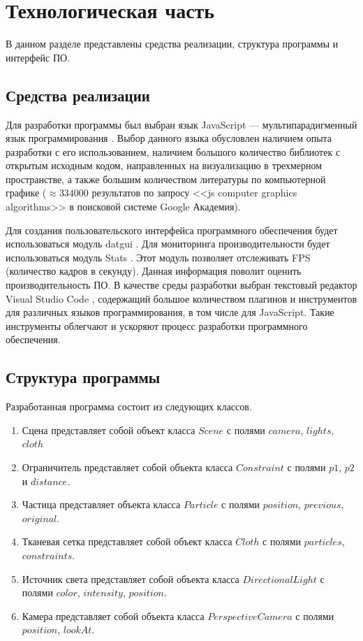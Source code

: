 \chapter{Технологическая часть}

В данном разделе представлены средства реализации, структура программы и интерфейс ПО.

\section{Средства реализации}
Для разработки программы был выбран язык JavaScript --- мультипарадигменный язык программирования \cite{js}. Выбор данного языка обусловлен наличием опыта разработки с его использованием, наличием большого количество библиотек с открытым исходным кодом, направленных на визуализацию в трехмерном пространстве, а также большим количеством литературы по компьютерной графике ($\approx334000$ результатов по запросу <<js computer graphics algorithms>> в поисковой системе Google Академия).

Для создания пользовательского интерфейса программного обеспечения будет использоваться модуль datgui \cite{datgui}. Для мониторинга производительности будет использоваться модуль Stats \cite{stats}. Этот модуль позволяет отслеживать FPS (количество кадров в секунду). Данная информация поволит оценить производительность ПО. В качестве среды разработки выбран текстовый редактор Visual Studio Code \cite{vscode}, содержащий большое количеством плагинов и инструментов для различных языков программирования, в том числе для JavaScript. Такие инструменты облегчают и ускоряют процесс разработки программного обеспечения.

\section{Структура программы}
Разработанная программа состоит из следующих классов.
\begin{enumerate}[label=\arabic*)]
	\item  Сцена представляет собой объект класса $Scene$ с полями $camera$, $lights$, $cloth$
	\item  Ограничитель представляет собой объекта класса $Constraint$ с полями $p1$, $p2$ и $distance$.
	\item  Частица представляет объекта класса $Particle$ с полями $position$, $previous$, $original$.
	\item  Тканевая сетка представляет собой объект класса $Cloth$ с полями $particles$, $constraints$.
	\item  Источник света представляет собой объекта класса $DirectionalLight$ с полями $color$, $intensity$, $position$.
	\item  Камера представляет собой объекта класса $PerspectiveCamera$ с полями $position$, $lookAt$.
\end{enumerate}

